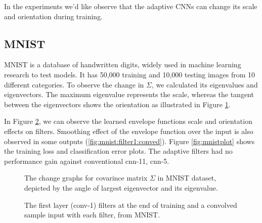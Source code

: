 \documentclass{bmvc2k}
\begin{document}
In the experiments we'd like observe that the adaptive CNNs can change its scale and orientation during training.

\subsection{MNIST}

MNIST \cite{mnist} is a database of handwritten digits, widely used in machine learning research to test models. It has 50,000 training and 10,000 testing images from 10 different categories. To observe the change in $\Sigma$, we calculated its eigenvalues and eigenvectors. The maximum eigenvalue represents the scale, whereas the tangent between the eigenvectors shows the orientation as illustrated in Figure \ref{fig:mnist:convchange}. 

In Figure \ref{fig:mnistfilt1}, we can observe the learned envelope functions scale and orientation effects on filters. Smoothing effect of the envelope function over the input is also observed in some outputs (\ref{fig:mnist:filter1:conved}).
Figure \ref{fig:mnistplot} shows the training loss and classification error plots. The adaptive filters had no performance gain against conventional cnn-11, cnn-5. 


\begin{figure}
	\centering
	\caption{The change graphs for covarince matrix $\Sigma$ in MNIST dataset, depicted by the angle of largest eigenvector and its eigenvalue.}
	\label{fig:mnist:convchange}
\end{figure}

\begin{figure}
	\centering
	\caption{The first layer (conv-1) filters at the end of training and a convolved sample input with each filter, from MNIST.}
	\label{fig:mnistfilt1}
\end{figure}
\end{document}
